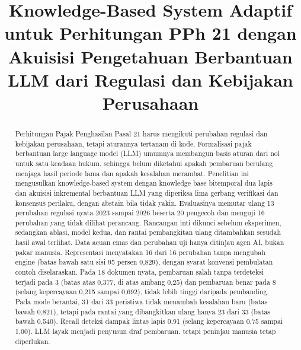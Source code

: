 \documentclass[conference]{IEEEtran}
\makeatletter
\DeclareRobustCommand{\en}[1]{{\usefont{\f@encoding}{\f@family}{\f@series}{it}#1\/}}
\makeatother
\begin{document}

\title{\en{Knowledge-Based System} Adaptif untuk Perhitungan PPh 21 dengan Akuisisi Pengetahuan Berbantuan LLM dari Regulasi dan Kebijakan Perusahaan}

\author{
\and
{}
}

\maketitle

\begin{abstract}
Perhitungan Pajak Penghasilan Pasal 21 harus mengikuti perubahan regulasi dan kebijakan perusahaan, tetapi aturannya tertanam di kode. Formalisasi pajak berbantuan \en{large language model} (LLM) umumnya membangun basis aturan dari nol untuk satu keadaan hukum, sehingga belum diketahui apakah pembaruan berulang menjaga hasil periode lama dan apakah kesalahan merambat. Penelitian ini mengusulkan \en{knowledge-based system} dengan \en{knowledge base} bitemporal dua lapis dan akuisisi inkremental berbantuan LLM yang diperiksa lima gerbang verifikasi dan konsensus perilaku, dengan \en{abstain} bila tidak yakin. Evaluasinya memutar ulang 13 perubahan regulasi nyata 2023 sampai 2026 beserta 20 pengecoh dan menguji 16 perubahan yang tidak dilihat perancang. Rancangan inti dikunci sebelum eksperimen, sedangkan ablasi, model kedua, dan rantai pembangkitan ulang ditambahkan sesudah hasil awal terlihat. Data acuan emas dan perubahan uji hanya ditinjau agen AI, bukan pakar manusia. Representasi menyatakan 16 dari 16 perubahan tanpa mengubah \en{engine} (batas bawah satu sisi 95 persen 0,829), dengan syarat konvensi pembulatan contoh diselaraskan. Pada 18 dokumen nyata, pembaruan salah tanpa terdeteksi terjadi pada 3 (batas atas 0,377, di atas ambang 0,25) dan pembaruan benar pada 8 (selang kepercayaan 0,215 sampai 0,692), tidak lebih tinggi daripada pembanding. Pada mode berantai, 31 dari 33 peristiwa tidak menambah kesalahan baru (batas bawah 0,821), tetapi pada rantai yang dibangkitkan ulang hanya 23 dari 33 (batas bawah 0,540). \en{Recall} deteksi dampak lintas lapis 0,91 (selang kepercayaan 0,75 sampai 1,00). LLM layak menjadi penyusun draf pembaruan, tetapi peninjau manusia tetap diperlukan.
\end{abstract}
\end{document}
